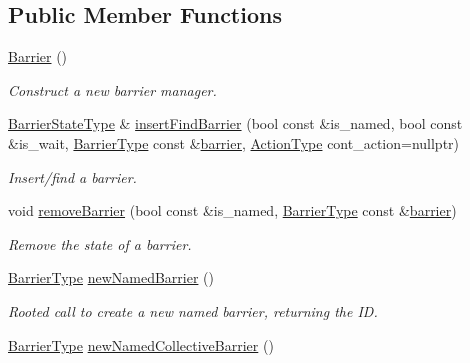 \subsection*{Public Member Functions}
\begin{DoxyCompactItemize}
\item 
\hyperlink{structvt_1_1collective_1_1barrier_1_1_barrier_aa69e5135299fa366a2c59ac96a9f318d}{Barrier} ()
\begin{DoxyCompactList}\small\item\em Construct a new barrier manager. \end{DoxyCompactList}\item 
\hyperlink{structvt_1_1collective_1_1barrier_1_1_barrier_a9b612818f7b44ca65f2caee0dee094f3}{Barrier\+State\+Type} \& \hyperlink{structvt_1_1collective_1_1barrier_1_1_barrier_aa3f74f986e523701c1d85ed97d3ad5a4}{insert\+Find\+Barrier} (bool const \&is\+\_\+named, bool const \&is\+\_\+wait, \hyperlink{namespacevt_a25e481f0d6bbc7204db23d1c87a62e77}{Barrier\+Type} const \&\hyperlink{structvt_1_1collective_1_1barrier_1_1_barrier_a05124050c7d353a4f3475ee1875dd46a}{barrier}, \hyperlink{namespacevt_ae0a5a7b18cc99d7b732cb4d44f46b0f3}{Action\+Type} cont\+\_\+action=nullptr)
\begin{DoxyCompactList}\small\item\em Insert/find a barrier. \end{DoxyCompactList}\item 
void \hyperlink{structvt_1_1collective_1_1barrier_1_1_barrier_a74756cba2fda8eedcc6b28ec69a36524}{remove\+Barrier} (bool const \&is\+\_\+named, \hyperlink{namespacevt_a25e481f0d6bbc7204db23d1c87a62e77}{Barrier\+Type} const \&\hyperlink{structvt_1_1collective_1_1barrier_1_1_barrier_a05124050c7d353a4f3475ee1875dd46a}{barrier})
\begin{DoxyCompactList}\small\item\em Remove the state of a barrier. \end{DoxyCompactList}\item 
\hyperlink{namespacevt_a25e481f0d6bbc7204db23d1c87a62e77}{Barrier\+Type} \hyperlink{structvt_1_1collective_1_1barrier_1_1_barrier_a0d8e74149ddca96f06c1ff6071b73a74}{new\+Named\+Barrier} ()
\begin{DoxyCompactList}\small\item\em Rooted call to create a new named barrier, returning the ID. \end{DoxyCompactList}\item 
\hyperlink{namespacevt_a25e481f0d6bbc7204db23d1c87a62e77}{Barrier\+Type} \hyperlink{structvt_1_1collective_1_1barrier_1_1_barrier_a3e101519fbcfa9eee139bf02f991f085}{new\+Named\+Collective\+Barrier} ()

\end{DoxyCompactItemize}
